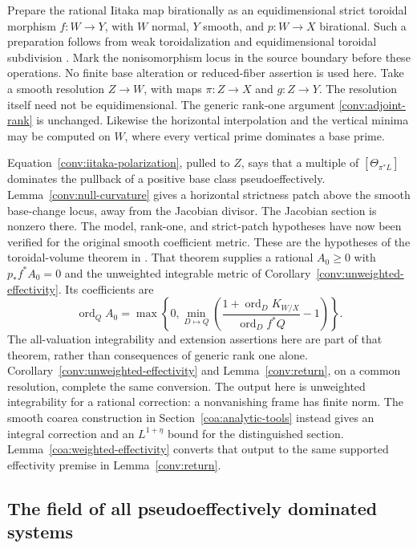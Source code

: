 Prepare the rational Iitaka map birationally as an equidimensional
strict toroidal morphism $f:W\to Y$, with $W$ normal, $Y$ smooth,
and $p:W\to X$ birational.  Such a preparation follows from weak
toroidalization \cite[Theorem~1.1]{ADK2013} and equidimensional
toroidal subdivision \cite[Proposition~4.4]{AK2000}.  Mark the
nonisomorphism locus in the source boundary before these operations.
No finite base alteration or reduced-fiber assertion is used here.
Take a smooth resolution $Z\to W$, with maps $\pi:Z\to X$ and
$g:Z\to Y$.  The resolution itself need not be equidimensional.
The generic rank-one argument \eqref{conv:adjoint-rank} is unchanged.
Likewise the horizontal interpolation and the vertical minima may be
computed on $W$, where every vertical prime dominates a base prime.

Equation~\eqref{conv:iitaka-polarization}, pulled to $Z$, says that a
multiple of $[\Theta_{\pi^*L}]$ dominates the pullback of a positive
base class pseudoeffectively.  Lemma~\ref{conv:null-curvature} gives a
horizontal strictness patch above the smooth base-change locus, away
from the Jacobian divisor.  The Jacobian section is nonzero there.
The model, rank-one, and strict-patch hypotheses have now been
verified for the original smooth coefficient metric.  These are the
hypotheses of the toroidal-volume theorem in
\cite[Theorem~2.1]{CompanionG}.
That theorem supplies a rational $A_0\ge0$ with
$p_*f^*A_0=0$ and the unweighted integrable metric of
Corollary~\ref{conv:unweighted-effectivity}.  Its coefficients are
\[
 \operatorname{ord}_Q A_0=
 \max\left\{0,\min_{D\mapsto Q}
       \left(\frac{1+\operatorname{ord}_D K_{W/X}}
                        {\operatorname{ord}_D f^*Q}-1\right)\right\}.
\]
The all-valuation integrability and extension assertions here are part
of that theorem, rather than consequences of generic rank one alone.
Corollary~\ref{conv:unweighted-effectivity} and
Lemma~\ref{conv:return}, on a common resolution, complete the same
conversion.  The output here is unweighted integrability for a rational
correction: a nonvanishing frame has finite norm.  The smooth coarea
construction in Section~\ref{coa:analytic-tools} instead gives an
integral correction and an $L^{1+\eta}$ bound for the distinguished
section.  Lemma~\ref{coa:weighted-effectivity} converts that output
to the same supported effectivity premise in
Lemma~\ref{conv:return}.

\subsection{The field of all pseudoeffectively dominated systems}
\label{conv:all-dominated}

